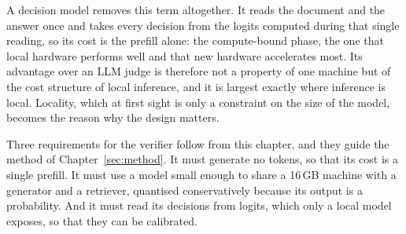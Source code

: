 A decision model removes this term altogether. It reads the document and the answer once and takes every decision from the
logits computed during that single reading, so its cost is the prefill alone: the compute-bound phase, the one that
local hardware performs well and that new hardware accelerates most. Its advantage over an LLM judge is therefore not a
property of one machine but of the cost structure of local inference, and it is largest exactly where inference is local.
Locality, which at first sight is only a constraint on the size of the model, becomes the reason why the design matters.

Three requirements for the verifier follow from this chapter, and they guide the method of Chapter~\ref{sec:method}. It
must generate no tokens, so that its cost is a single prefill. It must use a model small enough to share a 16\,GB machine
with a generator and a retriever, quantised conservatively because its output is a probability. And it must read its
decisions from logits, which only a local model exposes, so that they can be calibrated.
